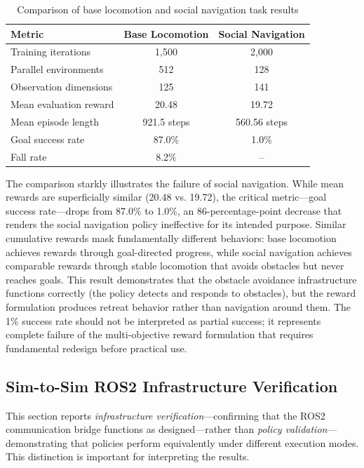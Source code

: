 \documentclass[12pt,a4paper]{article}
\begin{document}
\begin{table}[htbp]
\centering
\caption{Comparison of base locomotion and social navigation task results}
\label{tab:env_comparison}
\begin{tabular}{lcc}
\toprule
\textbf{Metric} & \textbf{Base Locomotion} & \textbf{Social Navigation} \\
\midrule
Training iterations & 1,500 & 2,000 \\
Parallel environments & 512 & 128 \\
Observation dimensions & 125 & 141 \\
Mean evaluation reward & 20.48 & 19.72 \\
Mean episode length & 921.5 steps & 560.56 steps \\
Goal success rate & 87.0\% & 1.0\% \\
Fall rate & 8.2\% & -- \\
\bottomrule
\end{tabular}
\end{table}

The comparison starkly illustrates the failure of social navigation. While mean rewards are superficially similar (20.48 vs. 19.72), the critical metric---goal success rate---drops from 87.0\% to 1.0\%, an 86-percentage-point decrease that renders the social navigation policy ineffective for its intended purpose. Similar cumulative rewards mask fundamentally different behaviors: base locomotion achieves rewards through goal-directed progress, while social navigation achieves comparable rewards through stable locomotion that avoids obstacles but never reaches goals. This result demonstrates that the obstacle avoidance infrastructure functions correctly (the policy detects and responds to obstacles), but the reward formulation produces retreat behavior rather than navigation around them. The 1\% success rate should not be interpreted as partial success; it represents complete failure of the multi-objective reward formulation that requires fundamental redesign before practical use.

\subsection{Sim-to-Sim ROS2 Infrastructure Verification}
\label{sec:sim2sim_ros2}

This section reports \textit{infrastructure verification}---confirming that the ROS2 communication bridge functions as designed---rather than \textit{policy validation}---demonstrating that policies perform equivalently under different execution modes. This distinction is important for interpreting the results.
\end{document}
